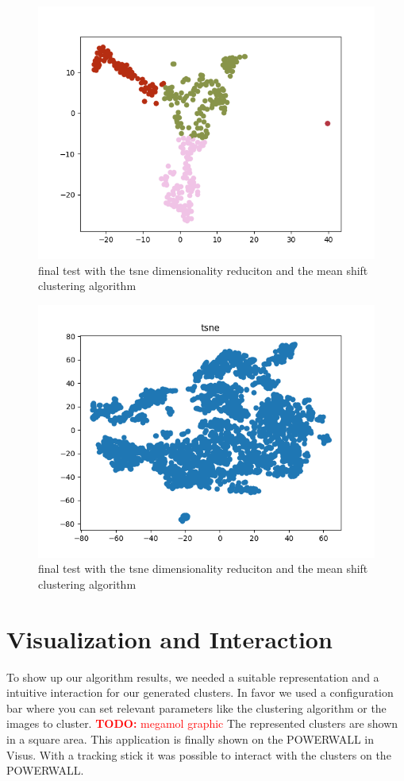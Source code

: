 \documentclass[journal]{vgtc}       %
\newcommand{\todo}[1]{\textcolor{red}{\textbf{TODO:} #1}}
\begin{document}
\begin{figure}[tb]
	\begin{center}
		\includegraphics[width=.75\linewidth]{MS-tsne.png}
	\end{center}
	\caption{\label{fig:tsne} final test with the tsne dimensionality reduciton and the mean shift clustering algorithm }
\end{figure}

\begin{figure}[tb]
	\begin{center}
		\includegraphics[width=.75\linewidth]{tsneFull.png}
	\end{center}
	\caption{\label{fig:tsnef} final test with the tsne dimensionality reduciton and the mean shift clustering algorithm }
\end{figure}

\section{Visualization and Interaction}

To show up our algorithm results, we needed a suitable representation and a intuitive interaction for our generated clusters. In favor we used a configuration bar where you can set relevant parameters like the clustering algorithm or the images to cluster. \todo{megamol graphic} The represented clusters are shown in a square area. This application is finally shown on the POWERWALL in Visus. With a tracking stick it was possible to interact with the clusters on the POWERWALL.
\end{document}
